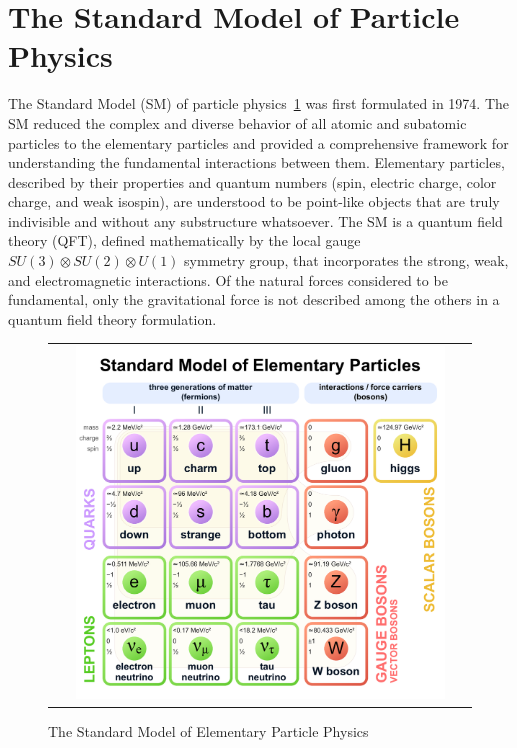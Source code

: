 \section{The Standard Model of Particle Physics}
The Standard Model (SM) of particle physics~\ref{Standard_Model} was first formulated in 1974.
The SM reduced the complex and diverse behavior of all atomic and subatomic particles to the elementary particles and provided a comprehensive framework for understanding the fundamental interactions between them. 
Elementary particles, described by their properties and quantum numbers (spin, electric charge, color charge, and  weak isospin), are understood to be point-like objects that are truly indivisible and without any substructure whatsoever.
The SM is a quantum field theory (QFT), defined mathematically by the local gauge $SU(3) \otimes SU(2) \otimes U(1)$ symmetry group, that incorporates the strong, weak, and electromagnetic interactions.
Of the natural forces considered to be fundamental, only the gravitational force is not described among the others in a quantum field theory formulation.
\begin{figure}[!h]
  \begin{center}
    \begin{tabular}{c}
        \includegraphics[width=0.9\textwidth]{fig_Theory/Standard_Model.pdf}
    \end{tabular}
    \caption{The Standard Model of Elementary Particle Physics
            }
    \label{Standard_Model}
  \end{center}
\end{figure}


